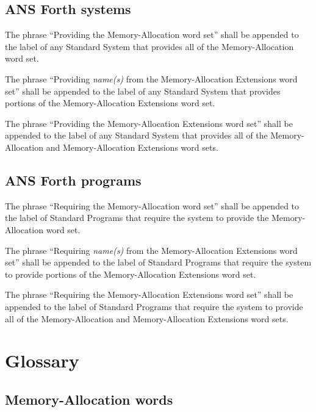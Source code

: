 \subsection{ANS Forth systems} %

The phrase ``Providing the Memory-Allocation word set'' shall be
appended to the label of any Standard System that provides all of
the Memory-Allocation word set.

The phrase ``Providing \emph{name(s)} from the Memory-Allocation
Extensions word set'' shall be appended to the label of any Standard
System that provides portions of the Memory-Allocation Extensions
word set.

The phrase ``Providing the Memory-Allocation Extensions word set''
shall be appended to the label of any Standard System that provides
all of the Memory-Allocation and Memory-Allocation Extensions word
sets.

\subsection{ANS Forth programs} %

The phrase ``Requiring the Memory-Allocation word set'' shall be
appended to the label of Standard Programs that require the system
to provide the Memory-Allocation word set.

The phrase ``Requiring \emph{name(s)} from the Memory-Allocation
Extensions word set'' shall be appended to the label of Standard
Programs that require the system to provide portions of the
Memory-Allocation Extensions word set.

The phrase ``Requiring the Memory-Allocation Extensions word set''
shall be appended to the label of Standard Programs that require
the system to provide all of the Memory-Allocation and
Memory-Al\-lo\-ca\-tion Extensions word sets.


\section{Glossary} %

\subsection{Memory-Allocation words} %

